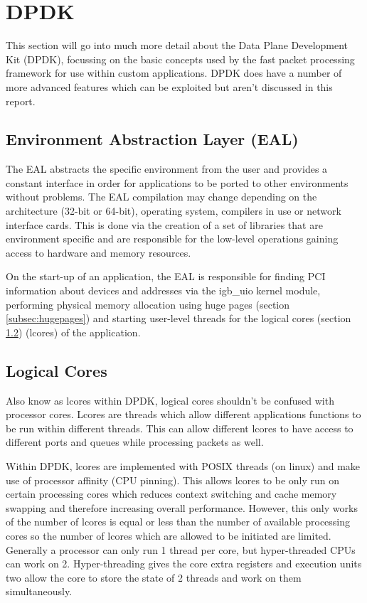 \documentclass[final_report.tex]{subfiles}
\begin{document}
\section{DPDK}
\label{sec:dpdk}
This section will go into much more detail about the Data Plane Development Kit (DPDK), focussing on the basic concepts used by the fast packet processing framework for use within custom applications. DPDK does have a number of more advanced features which can be exploited but aren't discussed in this report. 

\subsection{Environment Abstraction Layer (EAL)}
The EAL abstracts the specific environment from the user and provides a constant interface in order for applications to be ported to other environments without problems. The EAL compilation may change depending on the architecture (32-bit or 64-bit), operating system, compilers in use or network interface cards. This is done via the creation of a set of libraries that are environment specific and are responsible for the low-level operations gaining access to hardware and memory resources.

On the start-up of an application, the EAL is responsible for finding PCI information about devices and addresses via the igb\_uio kernel module, performing physical memory allocation using huge pages (section \ref{subsec:hugepages}) and starting user-level threads for the logical cores (section \ref{subsec:logical_cores}) (lcores) of the application. 

\subsection{Logical Cores}
\label{subsec:logical_cores}
Also know as lcores within DPDK, logical cores shouldn't be confused with processor cores. Lcores are threads which allow different applications functions to be run within different threads. This can allow different lcores to have access to different ports and queues while processing packets as well.

Within DPDK, lcores are implemented with POSIX threads (on linux) and make use of processor affinity (CPU pinning). This allows lcores to be only run on certain processing cores which reduces context switching and cache memory swapping and therefore increasing overall performance. However, this only works of the number of lcores is equal or less than the number of available processing cores so the number of lcores which are allowed to be initiated are limited. Generally a processor can only run 1 thread per core, but hyper-threaded CPUs can work on 2. Hyper-threading gives the core extra registers and execution units two allow the core to store the state of 2 threads and work on them simultaneously.
\end{document}
